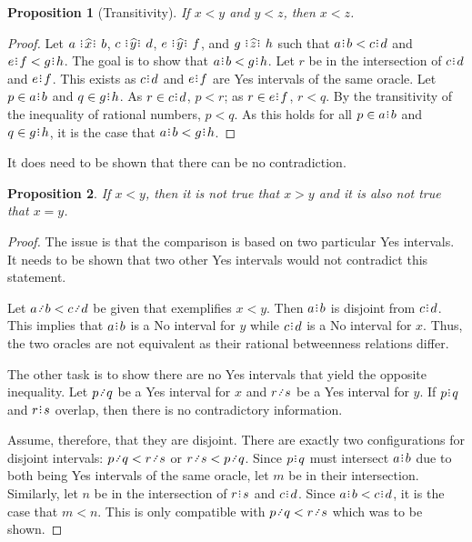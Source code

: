 \documentclass[12pt]{article}
\newtheorem{proposition}{Proposition}[section]
\begin{document}
\begin{proposition}[Transitivity]
    If $x <y$ and $y<z$, then $x < z$.
\end{proposition}

\begin{proof}
    Let $a \xora b$, $c \xora[y] d$, $e \xora[y] f$, and $g \xora[z] h$ such that $a\rint b < c\rint d$ and $e\rint f < g\rint h$. The goal is to show that $a\rint b < g\rint h$. Let $r$ be in the intersection of $c\rint d$ and $e\rint f$. This exists as $c\rint d$ and $e\rint f$ are Yes intervals of the same oracle. Let $p \in a\rint b$ and $q \in g\rint h$. As $r \in c\rint d$, $p < r$; as $r \in e\rint f$, $r < q$. By the transitivity of the inequality of rational numbers, $p < q$. As this holds for all $p \in a\rint b$ and $q \in g\rint h$, it is the case that $a\rint b <g\rint h$.
\end{proof}

It does need to be shown that there can be no contradiction. 

\begin{proposition}
    If $x < y$, then it is not true that $x > y$ and it is also not true that $x = y$.
\end{proposition}

\begin{proof}
    The issue is that the comparison is based on two particular Yes intervals. It needs to be shown that two other Yes intervals would not contradict this statement. 

    Let $a\lte b < c\lte d$ be given that exemplifies $x<y$. Then $a\rint b$ is disjoint from $c\rint d$. This implies that $a\rint b$ is a No interval for $y$ while $c\rint d$ is a No interval for $x$. Thus, the two oracles are not equivalent as their rational betweenness relations differ.

    The other task is to show there are no Yes intervals that yield the opposite inequality. Let $p\lte q$ be a Yes interval for $x$ and $r \lte s$ be a Yes interval for $y$. If $p\rint q$ and $r\rint s$ overlap, then there is no contradictory information. 

    Assume, therefore, that they are disjoint. There are exactly two configurations for disjoint intervals:  $p \lte q < r \lte s$ or $ r \lte s < p \lte q$. Since $p\rint q$ must intersect $a\rint b$ due to both being Yes intervals of the same oracle, let $m$ be in their intersection. Similarly, let $n$ be in the intersection of $r\rint s$ and $c\rint d$. Since $a\rint b < c\rint d$, it is the case that $m < n$. This is only compatible with $p \lte q < r \lte s$ which was to be shown. 

\end{proof}
\end{document}
